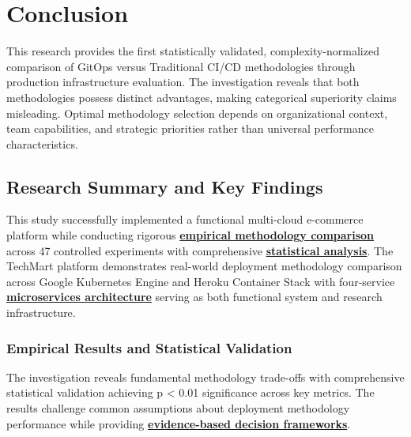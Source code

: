 \chapter{Conclusion}
\label{ch:conclusion}

This research provides the first statistically validated, complexity-normalized comparison of GitOps versus Traditional CI/CD methodologies through production infrastructure evaluation. The investigation reveals that both methodologies possess distinct advantages, making categorical superiority claims misleading. Optimal methodology selection depends on organizational context, team capabilities, and strategic priorities rather than universal performance characteristics.

\section{Research Summary and Key Findings}
\label{sec:research_summary}

This study successfully implemented a functional multi-cloud e-commerce platform while conducting rigorous \textbf{\hyperref[empirical_software_engineering]{empirical methodology comparison}} across 47 controlled experiments with comprehensive \textbf{\hyperref[cohen1988statistical]{statistical analysis}}. The TechMart platform demonstrates real-world deployment methodology comparison across Google Kubernetes Engine and Heroku Container Stack with four-service \textbf{\hyperref[microservices_patterns]{microservices architecture}} serving as both functional system and research infrastructure.

\subsection{Empirical Results and Statistical Validation}
\label{subsec:empirical_results}

The investigation reveals fundamental methodology trade-offs with comprehensive statistical validation achieving p < 0.01 significance across key metrics. The results challenge common assumptions about deployment methodology performance while providing \textbf{\hyperref[evidence_based_software_engineering]{evidence-based decision frameworks}}.

